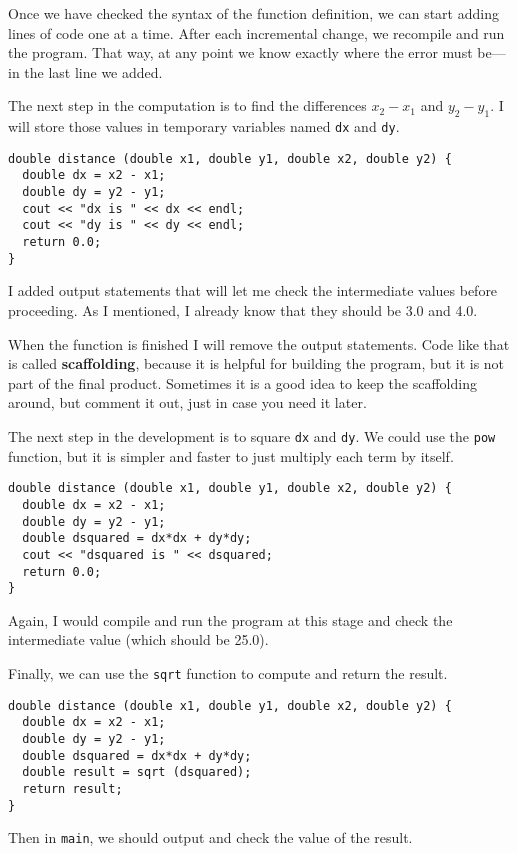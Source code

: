 Once we have checked the syntax of the function definition, we
can start adding lines of code one at a time.  After each
incremental change, we recompile and run the program.  That
way, at any point we know exactly where the error must be---in
the last line we added.

The next step in the computation is to find the differences
$x_2 - x_1$ and $y_2 - y_1$.  I will store those values in
temporary variables named {\tt dx} and {\tt dy}.

\begin{verbatim}
double distance (double x1, double y1, double x2, double y2) {
  double dx = x2 - x1;
  double dy = y2 - y1;
  cout << "dx is " << dx << endl;
  cout << "dy is " << dy << endl;
  return 0.0;
}
\end{verbatim}
%
I added output statements that will let me check the intermediate
values before proceeding.  As I mentioned, I already know that they
should be 3.0 and 4.0.


When the function is finished I will remove the output statements.  Code
like that is called {\bf scaffolding}, because it is helpful for
building the program, but it is not part of the final product.
Sometimes it is a good idea to keep the scaffolding around, but
comment it out, just in case you need it later.

The next step in the development is to square {\tt dx} and {\tt dy}.
We could use the {\tt pow} function, but it is simpler and
faster to just multiply each term by itself.

\begin{verbatim}
double distance (double x1, double y1, double x2, double y2) {
  double dx = x2 - x1;
  double dy = y2 - y1;
  double dsquared = dx*dx + dy*dy;
  cout << "dsquared is " << dsquared;
  return 0.0;
}
\end{verbatim}
%
Again, I would compile and run the program at this stage
and check the intermediate value (which should be 25.0).

Finally, we can use the {\tt sqrt} function to compute and
return the result.

\begin{verbatim}
double distance (double x1, double y1, double x2, double y2) {
  double dx = x2 - x1;
  double dy = y2 - y1;
  double dsquared = dx*dx + dy*dy;
  double result = sqrt (dsquared);
  return result;
}
\end{verbatim}
%
Then in {\tt main}, we should output and check the value of the result.

